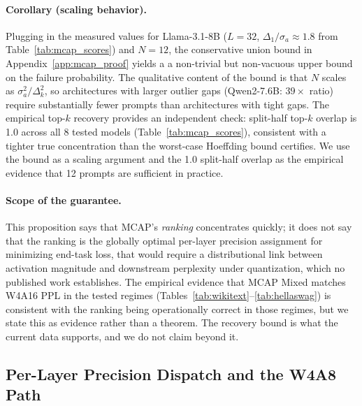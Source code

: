\documentclass{article}
\begin{document}
\paragraph{Corollary (scaling behavior).} Plugging in the measured values for
Llama-3.1-8B ($L=32$, $\Delta_1 / \sigma_a \approx 1.8$ from Table~\ref{tab:mcap_scores})
and $N=12$, the conservative union bound in Appendix~\ref{app:mcap_proof} yields a
a non-trivial but non-vacuous upper bound on the failure probability. The
qualitative content of the bound is that $N$ scales as
$\sigma_a^2 / \Delta_k^2$, so architectures with larger outlier gaps
(Qwen2-7.6B: $39\times$ ratio) require substantially fewer prompts than
architectures with tight gaps. The empirical top-$k$ recovery provides an
independent check: split-half top-$k$ overlap is 1.0 across all 8 tested
models (Table~\ref{tab:mcap_scores}), consistent with a tighter true
concentration than the worst-case Hoeffding bound certifies. We use the bound
as a scaling argument and the 1.0 split-half overlap as the empirical evidence
that 12 prompts are sufficient in practice.

\paragraph{Scope of the guarantee.} This proposition says that MCAP's \emph{ranking}
concentrates quickly; it does not say that the ranking is the globally optimal per-layer
precision assignment for minimizing end-task loss, that would require a distributional
link between activation magnitude and downstream perplexity under quantization, which no
published work establishes. The empirical evidence that MCAP Mixed matches W4A16 PPL in the tested
regimes (Tables~\ref{tab:wikitext}--\ref{tab:hellaswag}) is consistent with
the ranking being operationally correct in those regimes, but we state this as
evidence rather than a theorem. The recovery bound is what the current data
supports, and we do not claim beyond it.


\subsection{Per-Layer Precision Dispatch and the W4A8 Path}
\label{sec:w4a8_kernel}
\end{document}
